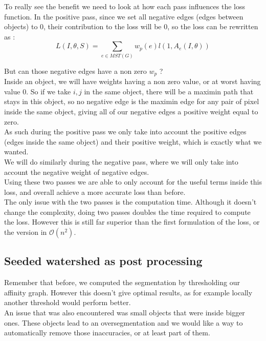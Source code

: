 To really see the benefit we need to look at how each pass influences the loss
function. In the positive pass, since we set all negative edges (edges between
objects) to 0, their contribution to the loss will be 0, so the loss can be
rewritten as :
\begin{equation*}
	L(I,\theta,S) = \sum_{e\in MST(G)} w_p(e)l(1,A_e(I,\theta))
\end{equation*}

But can those negative edges have a non zero $w_p$ ?\\
Inside an object, we will have weights having a non zero value, or at worst
having value 0. So if we take $i,j$ in the same object, there will be a maximin
path that stays in this object, so no negative edge is the maximin edge for any
pair of pixel inside the same object, giving all of our negative edges a
positive weight equal to zero.\\
As such during the positive pass we only take into account the positive edges
(edges inside the same object) and their positive weight, which is exactly what
we wanted.\\

We will do similarly during the negative pass, where we will only take into
account the negative weight of negative edges.\\

Using these two passes we are able to only account for the useful terms inside
this loss, and overall achieve a more accurate loss than before.\\
The only issue with the two passes is the computation time. Although it doesn't
change the complexity, doing two passes doubles the time required to compute
the loss. However this is still far superior than the first formulation of the
loss, or the version in $\mathcal{O}(n^2)$.


\subsection{Seeded watershed as post processing}

Remember that before, we computed the segmentation by thresholding our affinity
graph. However this doesn't give optimal results, as for example locally
another threshold would perform better.\\
An issue that was also encountered was small objects that were inside bigger
ones. These objects lead to an oversegmentation and we would like a way to
automatically remove those inaccuracies, or at least part of them.

